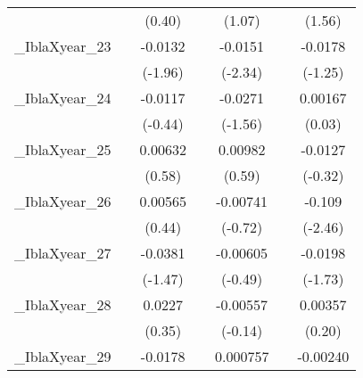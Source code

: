 {\begin{tabular}{l*{6}{c}}
            &                     &      (0.40)         &                     &      (1.07)         &                     &      (1.56)         \\
[1em]
\_IblaXyear\_23&                     &     -0.0132         &                     &     -0.0151\sym{*}  &                     &     -0.0178         \\
            &                     &     (-1.96)         &                     &     (-2.34)         &                     &     (-1.25)         \\
[1em]
\_IblaXyear\_24&                     &     -0.0117         &                     &     -0.0271         &                     &     0.00167         \\
            &                     &     (-0.44)         &                     &     (-1.56)         &                     &      (0.03)         \\
[1em]
\_IblaXyear\_25&                     &     0.00632         &                     &     0.00982         &                     &     -0.0127         \\
            &                     &      (0.58)         &                     &      (0.59)         &                     &     (-0.32)         \\
[1em]
\_IblaXyear\_26&                     &     0.00565         &                     &    -0.00741         &                     &      -0.109\sym{*}  \\
            &                     &      (0.44)         &                     &     (-0.72)         &                     &     (-2.46)         \\
[1em]
\_IblaXyear\_27&                     &     -0.0381         &                     &    -0.00605         &                     &     -0.0198         \\
            &                     &     (-1.47)         &                     &     (-0.49)         &                     &     (-1.73)         \\
[1em]
\_IblaXyear\_28&                     &      0.0227         &                     &    -0.00557         &                     &     0.00357         \\
            &                     &      (0.35)         &                     &     (-0.14)         &                     &      (0.20)         \\
[1em]
\_IblaXyear\_29&                     &     -0.0178         &                     &    0.000757         &                     &    -0.00240         \\

\end{tabular}}
